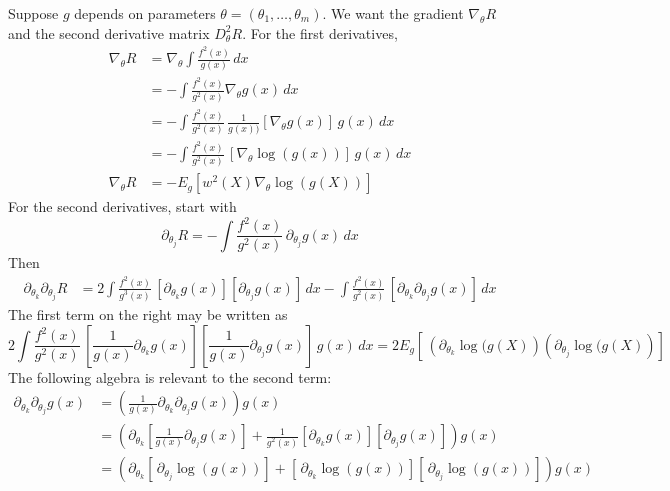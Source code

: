 \documentclass{article}
\begin{document}
Suppose $g$ depends on parameters $\theta = (\theta_1,\ldots,\theta_m)$.
We want the gradient $\nabla_{\theta} R$ and the second derivative matrix $D^2_{\theta} R$.
For the first derivatives,
\begin{align*}
   \nabla_{\theta} R &= \nabla_{\theta} \int \frac{f^2(x)}{g(x)}\,dx \\
     &= - \int \frac{f^2(x)}{g^2(x)} \nabla_{\theta} g(x) \,dx \\
     &= - \int \frac{f^2(x)}{g^2(x)} \,\frac{1}{g(x))} \left[ \nabla_{\theta} g(x)\right] \,g(x)\,dx \\
     &= - \int \frac{f^2(x)}{g^2(x)} \, \left[ \nabla_{\theta} \log(g(x))\right] \,g(x) \,dx \\
  \nabla_{\theta} R 
     &= - E_g \!\left[ w^2(X) \nabla_{\theta} \log(g(X)) \right]
\end{align*}
For the second derivatives, start with
\[
      \partial_{\theta_j} R = - \int \frac{f^2(x)}{g^2(x)} \,\partial_{\theta_j} g(x) \,dx 
\]
Then
\begin{align*}
     \partial_{\theta_k} \partial_{\theta_j}R 
           &= 2  \int \frac{f^2(x)}{g^3(x)} \,\left[\partial_{\theta_k}g(x)\right]  
                                              \left[\partial_{\theta_j} g(x)\right] \,dx 
             - \int \frac{f^2(x)}{g^2(x)} \,\left[\partial_{\theta_k}\partial_{\theta_j} g(x)\right] \,dx
\end{align*}
The first term on the right may be written as
\[
2\int \frac{f^2(x)}{g^2(x)} \,\left[\frac{1}{g(x)}\partial_{\theta_k} g(x)\right]  
                             \left[\frac{1}{g(x)}\partial_{\theta_j} g(x)\right]\, g(x) \,dx 
      =
  2 E_g\!\left[ \,\left(\partial_{\theta_k} \log( g(X)\right)
                 \left(\partial_{\theta_j}\log( g(X)\right) \right]
\]
The following algebra is relevant to the second term:
\begin{align*}
    \partial_{\theta_k}\partial_{\theta_j} g(x) 
 &= \left( \frac{1}{g(x)}\partial_{\theta_k}\partial_{\theta_j}g(x)\right)g(x) \\
 &= \left(\partial_{\theta_k}\left[ \frac{1}{g(x)}\partial_{\theta_j}g(x)\right]
         +\frac{1}{g^2(x)} \left[ \partial_{\theta_k} g(x)\right]
                           \left[ \partial_{\theta_j} g(x)\right]\right)g(x) \\
 &= \left(\partial_{\theta_k}\!\left[\, \partial_{\theta_j}\log(g(x))\right]
         +\left[\, \partial_{\theta_k}\log(g(x))\right]
          \left[\, \partial_{\theta_j}\log(g(x))\right]\right)g(x) \\
\end{align*}
\end{document}
